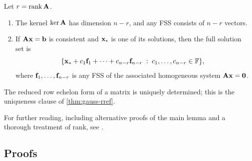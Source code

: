 \begin{theorem}
\label{thm:solution-structure}
Let $r = \operatorname{rank} \mathbf{A}$.
\begin{enumerate}[label=(\alph*)]
  \item The kernel $\ker \mathbf{A}$ has dimension $n - r$, and any FSS
        consists of $n - r$ vectors.
  \item If $\mathbf{A}\mathbf{x} = \mathbf{b}$ is consistent and
        $\mathbf{x}_*$ is one of its solutions, then the full solution
        set is
        \[
          \{\mathbf{x}_* + c_1 \mathbf{f}_1 + \dots + c_{n-r} \mathbf{f}_{n-r}
          \;:\; c_1, \dots, c_{n-r} \in \mathbb{F}\},
        \]
        where $\mathbf{f}_1, \dots, \mathbf{f}_{n-r}$ is any FSS of the
        associated homogeneous system $\mathbf{A}\mathbf{x} = \mathbf{0}$.
\end{enumerate}
\end{theorem}

\begin{corollary}
\label{cor:rref-unique}
The reduced row echelon form of a matrix is uniquely determined; this
is the uniqueness clause of \cref{thm:gauss-rref}.
\end{corollary}

\begin{remark}
For further reading, including alternative proofs of the main lemma
and a thorough treatment of rank, see \cite{Beklemishev2025}.
\end{remark}

\subsection*{Proofs}

